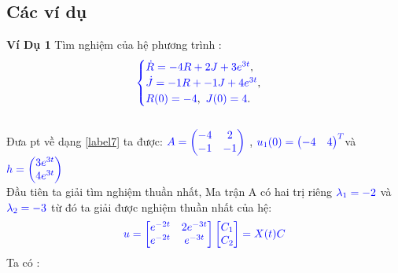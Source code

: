 \documentclass[a4paper]{article}
\begin{document}
	\subsection{Các ví dụ}
\textbf{Ví Dụ 1}
Tìm nghiệm của hệ phương trình :
 \begin{align}
	    \textcolor{blue}{
	    \begin{cases}
            \dot R = -4R + 2J + 3e^{3t} \textcolor{black}{,}\\
            \dot J = -1R + -1J + 4e^{3t}\textcolor{black}{,}\\
            R(0) = -4\textcolor{black}{,} \enskip J(0) = 4 \textcolor{black}{.}
        \end{cases}
        }
\notag
	\end{align}\\
 Đưa pt về dạng \eqref{label7} ta được: 
 \notag
 $\textcolor{blue}{A = \begin{pmatrix} -4 & 2\\ -1 & -1 \end{pmatrix}}$ , \enskip $\textcolor{blue}{u_1(0) = \begin{pmatrix} -4 & 4 \end{pmatrix}\sp{T}}$\enskip và   $\textcolor{blue}{h =\begin{pmatrix} 3e^{3t} \\ 4e^{3t} \end{pmatrix}}$\\
Đầu tiên ta giải tìm nghiệm thuần nhất, Ma trận A có hai trị riêng $\textcolor{blue}{\lambda_1=-2}$ và $\textcolor{blue}{\lambda_2=-3 }$ từ đó  ta giải được nghiệm thuần nhất của hệ:\\
\begin{align}
\notag
\textcolor{blue}{u= \begin{bmatrix} e^{-2t} & 2e^{-3t}\\ e^{-2t} & e^{-3t} \end{bmatrix} \begin{bmatrix} C_1 \\ C_2 \end{bmatrix}=X(t)C}
\end{align}
Ta có :  
\end{document}
